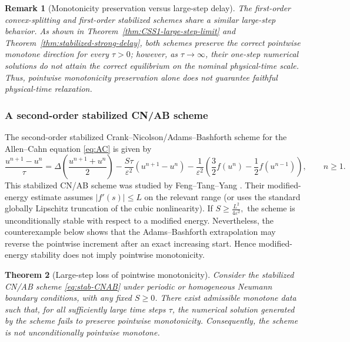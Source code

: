 \documentclass[final, 3p, times]{elsarticle}%
\newcommand{\eps}{\varepsilon}
\newtheorem{theorem}{Theorem}[section]
\newtheorem{remark}[theorem]{Remark}
\begin{document}
\begin{remark}[Monotonicity preservation versus large-step delay]
The first-order convex-splitting and first-order stabilized schemes share
a similar large-step behavior. As shown in
Theorem~\ref{thm:CSS1-large-step-limit} and
Theorem~\ref{thm:stabilized-strong-delay}, both schemes preserve the
correct pointwise monotone direction for every \(\tau>0\); however, as
\(\tau\to\infty\), their one-step numerical solutions do not attain the
correct equilibrium on the nominal physical-time scale. Thus, pointwise
monotonicity preservation alone does not guarantee faithful physical-time
relaxation.
\end{remark}

\subsubsection{A second-order stabilized CN/AB scheme}

The second-order stabilized Crank--Nicolson/Adams--Bashforth scheme for the Allen--Cahn equation \eqref{eq:AC} is given by
\begin{equation}
    \frac{u^{n+1}-u^n}{\tau}
    =\Delta\left(\frac{u^{n+1}+u^n}{2}\right)
    -\frac{S\tau}{\eps^2}(u^{n+1}-u^n)
    -\frac1{\eps^2}
    \left(\frac32 f(u^n)-\frac12 f(u^{n-1})\right),
    \qquad n\ge1.
    \label{eq:stab-CNAB}
\end{equation}
This stabilized CN/AB scheme was studied by Feng--Tang--Yang
\cite{feng2013stabilized}. Their modified-energy estimate assumes
\(|f'(s)|\le L\) on the relevant range (or uses the standard globally
Lipschitz truncation of the cubic nonlinearity). If
\(
S\ge \frac{L^2}{4\eps^2},
\)
the scheme is unconditionally stable with respect
to a modified energy. Nevertheless, the counterexample below shows that the
Adams--Bashforth extrapolation may reverse the
pointwise increment after an exact increasing start. Hence modified-energy
stability does not imply pointwise monotonicity.

\begin{theorem}[Large-step loss of pointwise monotonicity]
\label{thm:stab-CNAB-nonmonotone}
Consider the stabilized CN/AB scheme \eqref{eq:stab-CNAB} under periodic
or homogeneous Neumann boundary conditions, with any fixed \(S\ge0\). There exist admissible
monotone data such that, for all sufficiently large time steps \(\tau\),
the numerical solution generated by the scheme fails to preserve
pointwise monotonicity. Consequently, the scheme is not unconditionally
pointwise monotone.
\end{theorem}
\end{document}
